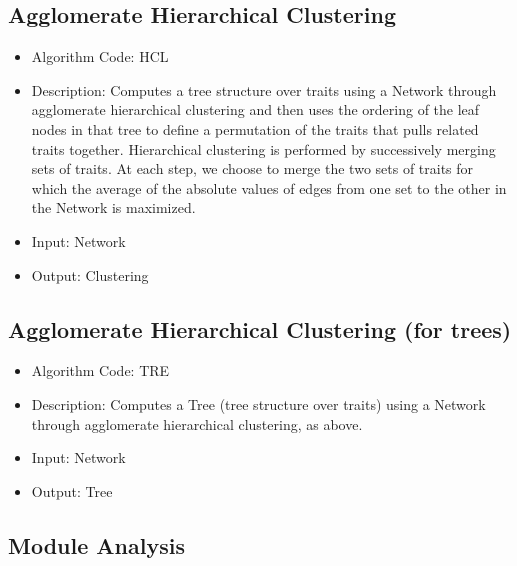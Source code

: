 \documentclass{article}
\begin{document}
\subsection{Agglomerate Hierarchical Clustering}

\begin{itemize}
\item Algorithm Code: HCL
\item Description: Computes a tree structure over traits using a Network through agglomerate hierarchical clustering and then uses the ordering of the leaf nodes in that tree to define a permutation of the traits that pulls related traits together. Hierarchical clustering is performed by successively merging sets of traits. At each step, we choose to merge the two sets of traits for which the average of the absolute values of edges from one set to the other in the Network is maximized.
\item Input: Network
\item Output: Clustering
\end{itemize}

\subsection{Agglomerate Hierarchical Clustering (for trees)}

\begin{itemize}
\item Algorithm Code: TRE
\item Description: Computes a Tree (tree structure over traits) using a Network through agglomerate hierarchical clustering, as above.
\item Input: Network
\item Output: Tree
\end{itemize}

\subsection{Module Analysis}
\end{document}
